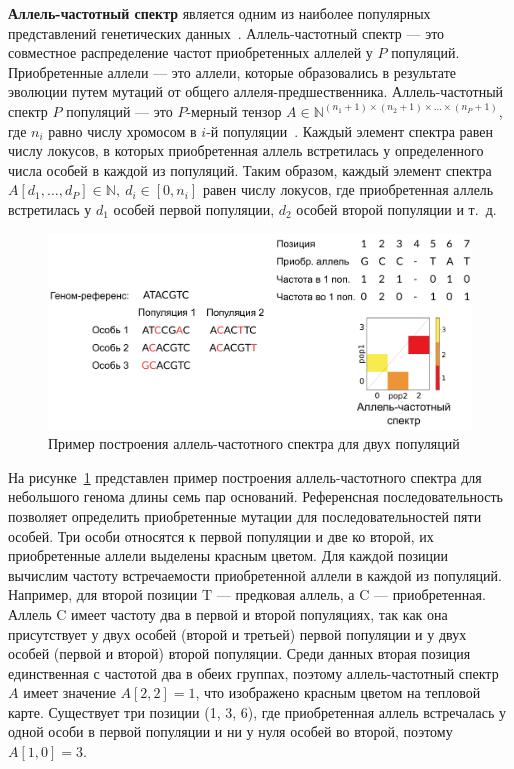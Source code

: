 \textbf{Аллель-частотный спектр} является одним из наиболее популярных представлений генетических данных~\cite{schraiber2015methods, beichman2018using}.
Аллель-частотный спектр --- это совместное распределение частот приобретенных аллелей у $P$ популяций. 
Приобретенные аллели --- это  аллели, которые образовались в результате эволюции путем мутаций от общего аллеля-предшественника.
Аллель-частотный спектр $P$ популяций --- это $P$-мерный тензор $A\in\mathbb{N}^{(n_1 + 1) \times (n_2 + 1) \times \ldots \times (n_P + 1)}$, где $n_i$ равно числу хромосом в $i$-й популяции~\cite{fisher1931xvii}.
Каждый элемент спектра равен числу локусов, в которых приобретенная аллель встретилась у определенного числа особей в каждой из популяций.
Таким образом, каждый элемент спектра $A[d_1,\dots,d_P]\in\mathbb{N},\ d_i\in [0, n_i]$ равен числу локусов, где приобретенная аллель встретилась у $d_1$ особей первой популяции, $d_2$ особей второй популяции и т.~д.

\begin{figure}[b]
    \includegraphics[width=\linewidth]{images/part1/data/AFS_build_example.pdf}
    \caption{Пример построения аллель-частотного спектра для двух популяций}\label{afs_example_build}
\end{figure}

На рисунке~\ref{afs_example_build} представлен пример построения аллель-частотного спектра для небольшого генома длины семь пар оснований.
Референсная последовательность позволяет определить приобретенные мутации для последовательностей пяти особей.
Три особи относятся к первой популяции и две ко второй, их приобретенные аллели выделены красным цветом.
Для каждой позиции вычислим частоту встречаемости приобретенной аллели в каждой из популяций.
Например, для второй позиции T --- предковая аллель, а C --- приобретенная.
Аллель C имеет частоту два в первой и второй популяциях, так как она присутствует у двух особей (второй и третьей) первой популяции и у двух особей (первой и второй) второй популяции.
Среди данных вторая позиция единственная с частотой два в обеих группах, поэтому аллель-частотный спектр $A$ имеет значение $A[2, 2] = 1$, что изображено красным цветом на тепловой карте.
Существует три позиции (1, 3, 6), где приобретенная аллель встречалась у одной особи в первой популяции и ни у нуля особей во второй, поэтому $A[1, 0] = 3$.

